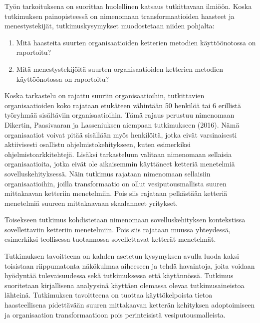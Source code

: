 Työn tarkoituksena on suorittaa huolellinen katsaus tutkittavaan
ilmiöön. Koska tutkimuksen painopisteessä on nimenomaan
transformaatioiden haasteet ja menestystekijät, tutkimuskysymykset
muodostetaan niiden pohjalta:

\begin{enumerate}
	\item Mitä haasteita suurten organisaatioiden ketterien metodien
	käyttöönotossa on raportoitu?
	\item Mitä menestystekijöitä suurten organisaatioiden ketterien metodien
	käyttöönotossa on raportoitu?
\end{enumerate}


Koska tarkastelu on rajattu suuriin organisaatioihin, tutkittavien
organisaatioiden koko rajataan etukäteen vähintään 50 henkilöä
tai 6 erillistä työryhmää sisältäviin organisaatioihin. Tämä
rajaus perustuu nimenomaan Dikertin, Paasivaaran ja Lasseniuksen
aiempaan tutkimukseen (2016). Nämä organisaatiot voivat pitää sisällään
myös henkilöitä, jotka eivät varsinaisesti aktiivisesti osallistu
ohjelmistokehitykseen, kuten esimerkiksi ohjelmistoarkkitehtejä.
Lisäksi tarkasteluun valitaan nimenomaan sellaisia organisaatioita,
jotka eivät ole aikaisemmin käyttäneet ketteriä menetelmiä
sovelluskehityksessä. Näin tutkimus rajataan nimenomaan sellaisiin
organisaatioihin, joilla transformaatio on ollut vesiputousmallista
suuren mittakaavan ketteriin menetelmiin. Pois siis rajataan
pelkästään ketteriä menetelmiä suureen mittakaavaan skaalanneet
yritykset.

Toisekseen tutkimus kohdistetaan nimenomaan sovelluskehityksen
kontekstissa sovellettaviin ketteriin menetelmiin. Pois siis rajataan
muussa yhteydessä, esimerkiksi teollisessa tuotannossa sovellettavat
ketterät menetelmät.

Tutkimuksen tavoitteena on kahden asetetun kysymyksen avulla
luoda kaksi toisistaan riippumatonta näkökulmaa aiheeseen ja
tehdä havaintoja, joita voidaan hyödyntää tulevaisuudessa
sekä tutkimuksessa että käytännössä. Tutkimus suoritetaan
kirjallisena analyysinä käyttäen olemassa olevaa tutkimusaineistoa
lähteinä. Tutkimuksen tavoitteena on tuottaa käyttökelpoista tietoa
haasteellisena pidettävään suuren mittakaavan ketterän kehityksen
adoptoimiseen ja organisaation transformaatioon pois perinteisistä
vesiputousmalleista.
